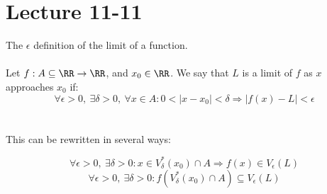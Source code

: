 \documentclass[class=scrartcl, crop=false]{standalone}
\date{2019-11-11}
\begin{document}
\section{Lecture 11-11}

\begin{definition}[Weierstrass]
  The $\epsilon$ definition of the limit of a function.
  \\\\
  Let $f: A \subseteq \RR \to \RR$, and $x_0 \in \RR$. We say that $L$ is a limit of $f$ as $x$ approaches $x_0$ if: 
  \[\forall \epsilon > 0,\  \exists \delta > 0, \ \forall x \in A : 0 < |x - x_0| < \delta \Rightarrow |f(x) - L| < \epsilon
  \]
  \\\\
  This can be rewritten in several ways:
  \begin{enumerate}
    \ii
    \[
      \forall \epsilon > 0,\ \exists \delta > 0 : x \in V_\delta^*(x_0) \cap A \Rightarrow f(x) \in V_\epsilon(L)
    \]
    \ii
    \[
      \forall \epsilon > 0,\ \exists \delta > 0 : f(V_\delta^*(x_0) \cap A) \subseteq V_\epsilon(L)
    \]
  \end{enumerate} 
\end{definition} 
\end{document}
